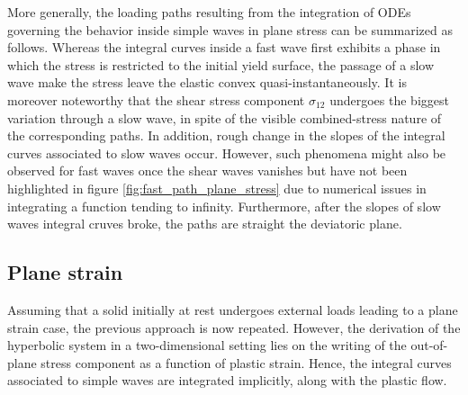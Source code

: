 More generally, the loading paths resulting from the integration of ODEs governing the behavior inside simple waves in plane stress can be summarized as follows.
Whereas the integral curves inside a fast wave first exhibits a phase in which the stress is restricted to the initial yield surface, the passage of a slow wave make the stress leave the elastic convex quasi-instantaneously.
It is moreover noteworthy that the shear stress component $\sigma_{12}$ undergoes the biggest variation through a slow wave, in spite of the visible combined-stress nature of the corresponding paths.
In addition, rough change in the slopes of the integral curves associated to slow waves occur.
However, such phenomena might also be observed for fast waves once the shear waves vanishes but have not been highlighted in figure \ref{fig:fast_path_plane_stress} due to numerical issues in integrating a function tending to infinity.
Furthermore, after the slopes of slow waves integral cruves broke, the paths are straight the deviatoric plane.

\newpage
\subsection{Plane strain}
\label{sec:num_plane_strain}
Assuming that a solid initially at rest undergoes external loads leading to a plane strain case, the previous approach is now repeated.
However, the derivation of the hyperbolic system in a two-dimensional setting lies on the writing of the out-of-plane stress component as a function of plastic strain.
Hence, the integral curves associated to simple waves are integrated implicitly, along with the plastic flow.

